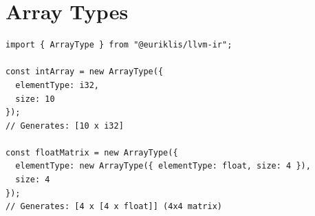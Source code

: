 \section{Array Types}

\begin{lstlisting}[style=ts]
import { ArrayType } from "@euriklis/llvm-ir";

const intArray = new ArrayType({
  elementType: i32,
  size: 10
});
// Generates: [10 x i32]

const floatMatrix = new ArrayType({
  elementType: new ArrayType({ elementType: float, size: 4 }),
  size: 4
});
// Generates: [4 x [4 x float]] (4x4 matrix)
\end{lstlisting}

